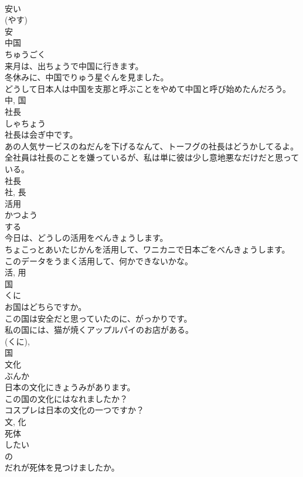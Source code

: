 \documentclass[8pt]{extreport}
\begin{document}
\begin{CJK}{UTF8}{min}
\\	安い 
\\	(やす) 
\\	安	
\\	中国	
\\	ちゅうごく	
\\	来月は、出ちょうで中国に行きます。	
\\	冬休みに、中国でりゅう星ぐんを見ました。	
\\	どうして日本人は中国を支那と呼ぶことをやめて中国と呼び始めたんだろう。	
\\	中, 国	
\\	社長	
\\	しゃちょう	
\\	社長は会ぎ中です。	
\\	あの人気サービスのねだんを下げるなんて、トーフグの社長はどうかしてるよ。	
\\	全社員は社長のことを嫌っているが、私は単に彼は少し意地悪なだけだと思っている。	
\\	社長 
\\	社, 長	
\\	活用	
\\	かつよう	
\\	する 
\\	今日は、どうしの活用をべんきょうします。	
\\	ちょこっとあいたじかんを活用して、ワニカニで日本ごをべんきょうします。	
\\	このデータをうまく活用して、何かできないかな。	
\\	活, 用	
\\	国	
\\	くに	
\\	お国はどちらですか。	
\\	この国は安全だと思っていたのに、がっかりです。	
\\	私の国には、猫が焼くアップルパイのお店がある。	
\\	(くに), 
\\	国	
\\	文化	
\\	ぶんか	
\\	日本の文化にきょうみがあります。	
\\	この国の文化にはなれましたか？	
\\	コスプレは日本の文化の一つですか？	
\\	文, 化	
\\	死体	
\\	したい	
\\	の 
\\	だれが死体を見つけましたか。	

\end{CJK}
\end{document}
